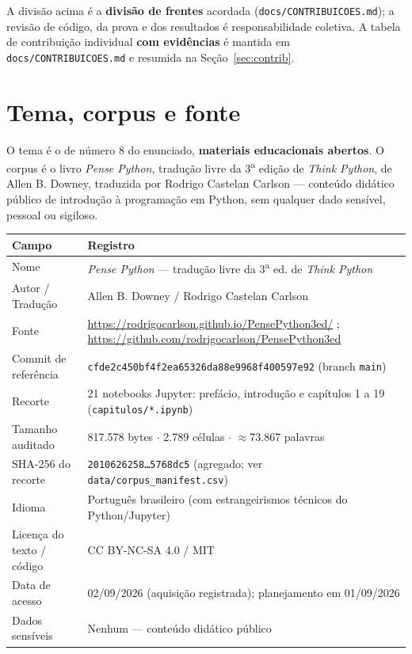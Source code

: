 \documentclass[11pt,a4paper]{article}
\begin{document}
\begin{nota}
A divisão acima é a \textbf{divisão de frentes} acordada (\texttt{docs/CONTRIBUICOES.md}); a revisão de código, da prova e dos resultados é
responsabilidade coletiva. A tabela de contribuição individual \textbf{com evidências} é mantida em
\texttt{docs/CONTRIBUICOES.md} e resumida na Seção~\ref{sec:contrib}.
\end{nota}

\section{Tema, corpus e fonte}
O tema é o de número 8 do enunciado, \textbf{materiais educacionais abertos}. O corpus é o livro
\emph{Pense Python}, tradução livre da 3\textsuperscript{a} edição de \emph{Think Python}, de Allen
B. Downey, traduzida por Rodrigo Castelan Carlson --- conteúdo didático público de introdução à
programação em Python, sem qualquer dado sensível, pessoal ou sigiloso.

\begin{table}[h]
\small\centering
\begin{tabularx}{\textwidth}{@{}p{4.2cm}Y@{}}
\toprule
\textbf{Campo} & \textbf{Registro}\\
\midrule
Nome & \emph{Pense Python} --- tradução livre da 3\textsuperscript{a} ed. de \emph{Think Python}\\
Autor / Tradução & Allen B. Downey / Rodrigo Castelan Carlson\\
Fonte & \url{https://rodrigocarlson.github.io/PensePython3ed/} ; \url{https://github.com/rodrigocarlson/PensePython3ed}\\
Commit de referência & \texttt{cfde2c450bf4f2ea65326da88e9968f400597e92} (branch \texttt{main})\\
Recorte & 21 notebooks Jupyter: prefácio, introdução e capítulos 1 a 19 (\texttt{capitulos/*.ipynb})\\
Tamanho auditado & 817.578 bytes $\cdot$ 2.789 células $\cdot$ $\approx$73.867 palavras\\
SHA-256 do recorte & \texttt{2010626258\dots5768dc5} (agregado; ver \texttt{data/corpus\_manifest.csv})\\
Idioma & Português brasileiro (com estrangeirismos técnicos do Python/Jupyter)\\
Licença do texto / código & CC BY-NC-SA 4.0 / MIT\\
Data de acesso & 02/09/2026 (aquisição registrada); planejamento em 01/09/2026\\
Dados sensíveis & Nenhum --- conteúdo didático público\\
\bottomrule
\end{tabularx}
\end{table}
\end{document}
